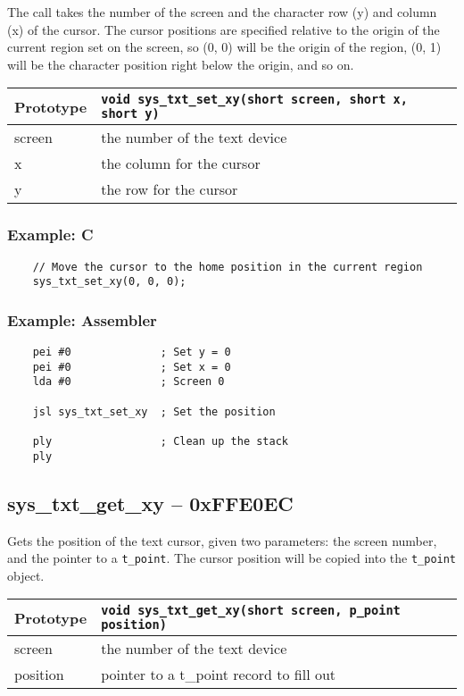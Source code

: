 The call takes the number of the screen and the character row (y) and column (x) of the cursor. The cursor positions are specified relative to the origin of the current region set on the screen, so (0, 0) will be the origin of the region, (0, 1) will be the character position right below the origin, and so on.

\bigskip

\begin{tabular}{|l||l|} \hline
Prototype & \lstinline!void sys_txt_set_xy(short screen, short x, short y)! \\ \hline
screen & the number of the text device \\ \hline
x & the column for the cursor \\ \hline
y & the row for the cursor \\ \hline
\end{tabular}

\subsubsection*{Example: C}
\begin{lstlisting}
    // Move the cursor to the home position in the current region
    sys_txt_set_xy(0, 0, 0);
\end{lstlisting}

\subsubsection*{Example: Assembler}
\begin{verbatim}
    pei #0              ; Set y = 0
    pei #0              ; Set x = 0
    lda #0              ; Screen 0

    jsl sys_txt_set_xy  ; Set the position

    ply                 ; Clean up the stack
    ply
\end{verbatim}

\subsection*{sys\_txt\_get\_xy -- 0xFFE0EC}
Gets the position of the text cursor, given two parameters: the screen number, and the pointer to a \verb+t_point+.
The cursor position will be copied into the \verb+t_point+ object.

\bigskip

\begin{tabular}{|l||l|} \hline
Prototype & \lstinline!void sys_txt_get_xy(short screen, p_point position)! \\ \hline
screen & the number of the text device \\ \hline
position & pointer to a t\_point record to fill out \\ \hline
\end{tabular}


